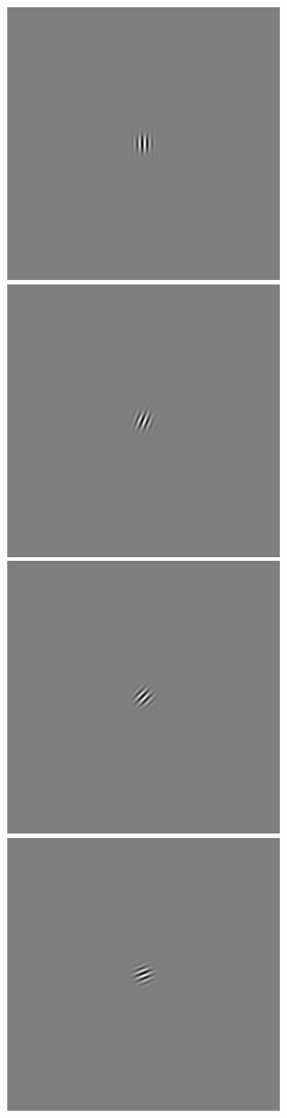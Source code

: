 \begin{figure}
 \begin{center}
 \includegraphics[scale=0.1]{ch4/figures/rGabor0_0.jpg}
 \includegraphics[scale=0.1]{ch4/figures/rGabor0_1.jpg}
 \includegraphics[scale=0.1]{ch4/figures/rGabor0_2.jpg}
 \includegraphics[scale=0.1]{ch4/figures/rGabor0_3.jpg}

\end{center}
\end{figure}
